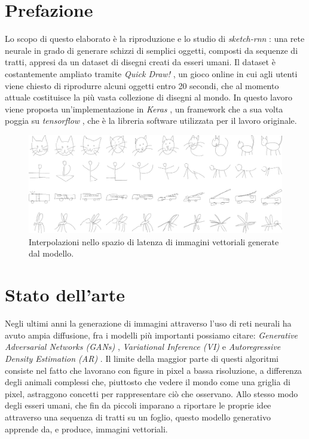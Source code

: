 \section{Prefazione}
Lo scopo di questo elaborato è la riproduzione e lo studio di \textit{sketch-rnn} \cite{sketchrnn}: una rete neurale in grado di generare schizzi di semplici oggetti, composti da sequenze di tratti, appresi da un dataset di disegni creati da esseri umani. Il dataset è costantemente ampliato tramite \textit{Quick Draw!} \cite{quickdraw}, un gioco online in cui agli utenti viene chiesto di riprodurre alcuni oggetti entro 20 secondi, che al momento attuale costituisce la più vasta collezione di disegni al mondo. In questo lavoro viene proposta un'implementazione in \textit{Keras} \cite{keras}, un framework che a sua volta poggia su \textit{tensorflow} \cite{tensorflow}, che è la libreria software utilizzata per il lavoro originale.
\begin{figure}[ht]
	\centering
	\includegraphics[width=\linewidth]{img/sketch_rnn_latent.png}
	\caption{Interpolazioni nello spazio di latenza di immagini vettoriali generate dal modello.}
	\label{fig:1.1}
\end{figure}
\section{Stato dell'arte}
Negli ultimi anni la generazione di immagini attraverso l'uso di reti neurali ha avuto ampia diffusione, fra i modelli più importanti possiamo citare: \textit{Generative Adversarial Networks (GANs)} \cite{GAN}, \textit{Variational Inference (VI)} \cite{VI} e \textit{Autoregressive Density Estimation (AR)} \cite{AR}. Il limite della maggior parte di questi algoritmi consiste nel fatto che lavorano con figure in pixel a bassa risoluzione, a differenza degli animali complessi che, piuttosto che vedere il mondo come una griglia di pixel, astraggono concetti per rappresentare ciò che osservano. Allo stesso modo degli esseri umani, che fin da piccoli imparano a riportare le proprie idee attraverso una sequenza di tratti su un foglio, questo modello generativo apprende da, e produce, immagini vettoriali.

